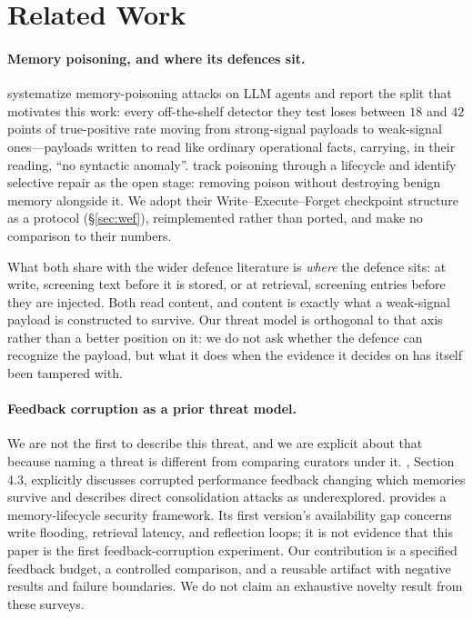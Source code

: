 \section{Related Work}
\label{sec:related}

\paragraph{Memory poisoning, and where its defences sit.}
\citet{mpbench2026} systematize memory-poisoning attacks on LLM agents
and report the split that motivates this work: every off-the-shelf
detector they test loses between $18$ and $42$ points of true-positive
rate moving from strong-signal payloads to weak-signal ones---payloads
written to read like ordinary operational facts, carrying, in their
reading, ``no syntactic anomaly''. \citet{memsecbench2026} track poisoning through a lifecycle
and identify selective repair as the open stage: removing poison without
destroying benign memory alongside it. We adopt their
Write--Execute--Forget checkpoint structure as a protocol
(\S\ref{sec:wef}), reimplemented rather than ported, and make no
comparison to their numbers.

What both share with the wider defence literature is \emph{where} the
defence sits: at write, screening text before it is stored, or at
retrieval, screening entries before they are injected. Both read content,
and content is exactly what a weak-signal payload is constructed to
survive. Our threat model is orthogonal to that axis rather than a better
position on it: we do not ask whether the defence can recognize the
payload, but what it does when the evidence it decides on has itself been
tampered with.

\paragraph{Feedback corruption as a prior threat model.}
We are not the first to describe this threat, and we are explicit about
that because naming a threat is different from comparing curators under it.
\citet{lin2026selfevolving}, Section 4.3, explicitly discusses corrupted
performance feedback changing which memories survive and describes direct
consolidation attacks as underexplored. \citet{lin2026memsurvey} provides a
memory-lifecycle security framework. Its first version's availability gap
concerns write flooding, retrieval latency, and reflection loops; it is not
evidence that this paper is the first feedback-corruption experiment.
Our contribution is a specified feedback budget, a controlled comparison,
and a reusable artifact with negative results and failure boundaries.
We do not claim an exhaustive novelty result from these surveys.

